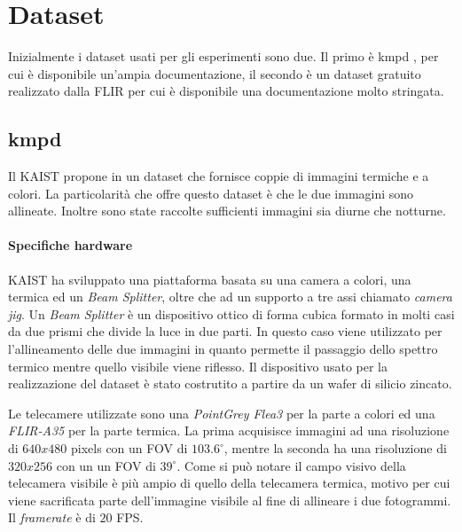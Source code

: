\label{chap:examples}

\section{Dataset}
\label{sec:dataset}
Inizialmente i dataset usati per gli esperimenti sono due. Il primo è \ac{kmpd} \cite{DBLP:conf/cvpr/HwangPKCK15}, 
per cui è disponibile un'ampia documentazione, il secondo è un dataset gratuito realizzato dalla FLIR \cite{FLIRAdas} per cui è disponibile una documentazione molto stringata.
\subsection{\acl{kmpd}}
\label{subsec:kmpd}
Il \ac{KAIST} propone in \cite{DBLP:conf/cvpr/HwangPKCK15} un dataset che fornisce coppie di immagini termiche e a colori. La particolarità che offre questo dataset è che le due immagini sono allineate. Inoltre sono state raccolte sufficienti immagini sia diurne che notturne.
\paragraph{Specifiche hardware}
\ac{KAIST} ha sviluppato una piattaforma basata su una camera a colori, una termica ed un \textit{Beam Splitter}, oltre che ad un supporto a tre assi chiamato \textit{camera jig}. Un \textit{Beam Splitter} è un dispositivo ottico di forma cubica formato in molti casi da due prismi che divide la luce in due parti. In questo caso viene utilizzato per l'allineamento delle due immagini in quanto permette il passaggio dello spettro termico mentre quello visibile viene riflesso. Il dispositivo usato per la realizzazione del dataset è stato costrutito a partire da un wafer di silicio zincato.

Le telecamere utilizzate sono una \textit{PointGrey Flea3} per la parte a colori ed una \textit{FLIR-A35} per la parte termica. La prima acquisisce immagini ad una risoluzione di $640 x 480$ pixels con un \ac{FOV} di $103.6^\circ$, mentre la seconda ha una risoluzione di $320 x 256$ con un un \ac{FOV} di $39^\circ$. Come si può notare il campo visivo della telecamera visibile è più ampio di quello della telecamera termica, motivo per cui viene sacrificata parte dell'immagine visibile al fine di allineare i due fotogrammi. Il \textit{framerate} è di $20$ FPS.
